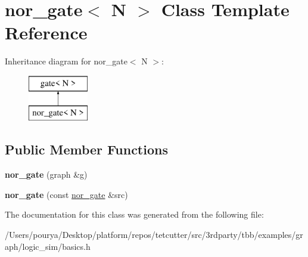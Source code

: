 \hypertarget{classnor__gate}{}\section{nor\+\_\+gate$<$ N $>$ Class Template Reference}
\label{classnor__gate}
Inheritance diagram for nor\+\_\+gate$<$ N $>$\+:\begin{figure}[H]
\begin{center}
\leavevmode
\includegraphics[height=2.000000cm]{classnor__gate}
\end{center}
\end{figure}
\subsection*{Public Member Functions}
\begin{DoxyCompactItemize}
\item 
\hypertarget{classnor__gate_a58d40ac183684c1ab0370ddd7e714bec}{}{\bfseries nor\+\_\+gate} (graph \&g)\label{classnor__gate_a58d40ac183684c1ab0370ddd7e714bec}

\item 
\hypertarget{classnor__gate_a934269eb94ed83fdb041736e614ba999}{}{\bfseries nor\+\_\+gate} (const \hyperlink{classnor__gate}{nor\+\_\+gate} \&src)\label{classnor__gate_a934269eb94ed83fdb041736e614ba999}

\end{DoxyCompactItemize}


The documentation for this class was generated from the following file\+:\begin{DoxyCompactItemize}
\item 
/\+Users/pourya/\+Desktop/platform/repos/tetcutter/src/3rdparty/tbb/examples/graph/logic\+\_\+sim/basics.\+h\end{DoxyCompactItemize}
